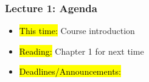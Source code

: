 
\begin{frame}
    \frametitle{Lecture 1: Agenda}
    \begin{itemize}
        \item \hl{This time: }Course introduction
        \item \hl{Reading: }Chapter 1 for next time
        \item \hl{Deadlines/Announcements: }
    \end{itemize}
    
\end{frame}
    